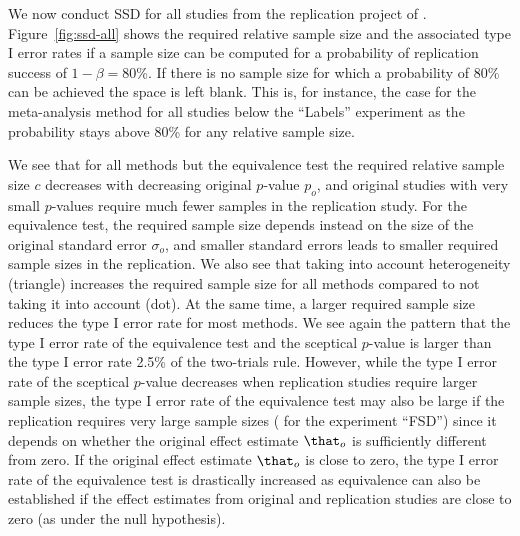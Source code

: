 We now conduct SSD for all studies from the replication project of
\citet{Protzko2020}. Figure~\ref{fig:ssd-all} shows the required relative sample
size and the associated type I error rates if a sample size can be computed for
a probability of replication success of
$1 - \beta = 80$\%. If there is no sample size for
which a probability of $80$\% can be achieved the space
is left blank. This is, for instance, the case for the meta-analysis method for
all studies below the ``Labels'' experiment as the probability stays above
$80$\% for any relative sample size. %

We see that for all methods but the equivalence test the required relative
sample size $c$ decreases with decreasing original $p$-value $p_{o}$, and
original studies with very small $p$-values require much fewer samples in the
replication study. For the equivalence test, the required sample size depends
instead on the size of the original standard error $\sigma_{o}$, and smaller
standard errors leads to smaller required sample sizes in the
replication. %
We also see that taking into account heterogeneity (triangle) increases the
required sample size for all methods compared to not taking it into account
(dot). At the same time, a larger required sample size reduces the type I error
rate for most methods. We see again the pattern that the type I error rate of
the equivalence test and the sceptical $p$-value is larger than the type I error
rate 2.5\% of the two-trials rule. However, while the type I error rate of the
sceptical $p$-value decreases when replication studies require larger sample
sizes, the type I error rate of the equivalence test may also be large if the
replication requires very large sample sizes (\eg{} for the experiment ``FSD'')
since it depends on whether the original effect estimate $\that_{o}$ is
sufficiently different from zero. If the original effect estimate $\that_{o}$ is
close to zero, the type I error rate of the equivalence test is drastically
increased as equivalence can also be established if the effect estimates from
original and replication studies are close to zero (as under the null
hypothesis).

